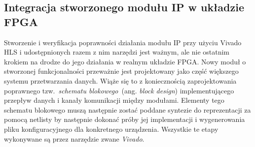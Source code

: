 \subsection{Integracja stworzonego modułu IP w układzie FPGA}
Stworzenie i weryfikacja poprawności działania modułu IP przy użyciu Vivado HLS i udostępnionych razem z nim narzędzi jest ważnym, ale nie ostatnim krokiem na drodze do jego działania w realnym układzie FPGA. Nowy moduł o stworzonej funkcjonalności przeważnie jest projektowany jako część większego systemu przetwarzania danych. Wiąże się to z koniecznością zaprojektowania poprawnego tzw.~\textit{schematu blokowego}~(ang. \textit{block design}) implementującego przepływ danych i kanały komunikacji między modułami. Elementy tego schematu blokowego muszą następnie zostać poddane syntezie do reprezentacji za pomocą netlisty by następnie dokonać próby jej implementacji i wygenerowania pliku konfiguracyjnego dla konkretnego urządzenia. Wszystkie te etapy wykonywane są przez narzędzie zwane \textit{Vivado}.
